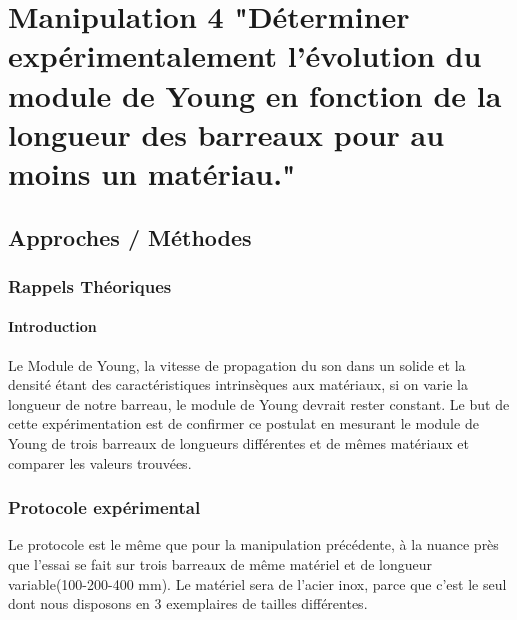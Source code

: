 \section{Manipulation 4 "Déterminer expérimentalement l'évolution du module
de Young en fonction de la longueur des barreaux pour au moins 
un matériau."}
\subsection{Approches / Méthodes}
\subsubsection{\large Rappels Théoriques}
\paragraph{Introduction}
Le Module de Young, la vitesse de propagation du son dans un solide et la densité étant des 
caractéristiques intrinsèques aux matériaux, si on varie la longueur de notre barreau, le module de 
Young devrait rester constant. Le but de cette expérimentation est de confirmer ce postulat en 
mesurant le module de Young de trois barreaux de longueurs différentes et de mêmes
matériaux et comparer les valeurs trouvées.

\subsubsection{\large Protocole expérimental}
Le protocole est le même que pour la manipulation précédente, à la nuance près que
l'essai se fait sur trois barreaux de même matériel et de longueur variable(100-200-400 mm).
Le matériel sera de l'acier inox, parce que c'est le seul dont nous disposons en 3 exemplaires de tailles 
différentes.

